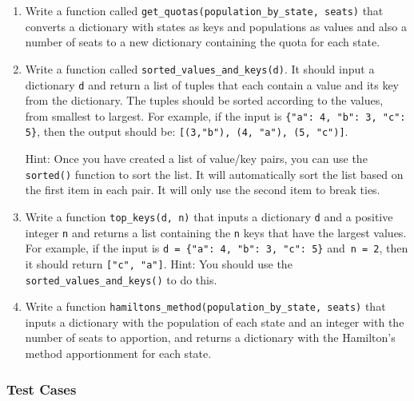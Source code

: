 \documentclass[12pt]{article}
\begin{document}
\begin{enumerate}
\item Write a function called \verb|get_quotas(population_by_state, seats)| that converts a dictionary with states as keys and populations as values and also a number of seats to a new dictionary containing the quota for each state. %

\item Write a function called \verb|sorted_values_and_keys(d)|.  It should input a dictionary \verb|d| and return a list of tuples that each contain a value and its key from the dictionary. The tuples should be sorted according to the values, from smallest to largest. For example, if the input is \verb|{"a": 4, "b": 3, "c": 5}|, then the output should be: \verb|[(3,"b"), (4, "a"), (5, "c")]|.

Hint: Once you have created a list of value/key pairs, you can use the \verb|sorted()| function to sort the list.  It will automatically sort the list based on the first item in each pair. It will only use the second item to break ties.  

\item Write a function \verb|top_keys(d, n)| that inputs a dictionary \verb|d| and a positive integer \verb|n| and returns a list containing the \verb|n| keys that have the largest values. For example, if the input is \verb|d = {"a": 4, "b": 3, "c": 5}| and\ \verb|n = 2|, then it should return \verb|["c", "a"]|.  Hint: You should use the \verb|sorted_values_and_keys()| to do this. 

\item Write a function \verb|hamiltons_method(population_by_state, seats)| that inputs a dictionary with the population of each state and an integer with the number of seats to apportion, and returns a dictionary with the Hamilton's method apportionment for each state.  



\end{enumerate}

\subsubsection*{Test Cases}
\end{document}
